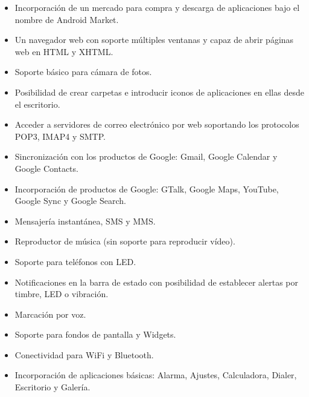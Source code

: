 \begin{itemize}
	\item Incorporación de un mercado para compra y descarga de aplicaciones bajo el nombre de Android Market.
	\item Un navegador web con soporte múltiples ventanas y  capaz de abrir páginas web en HTML y XHTML.
	\item Soporte básico para cámara de fotos.
	\item Posibilidad de crear carpetas e introducir iconos de aplicaciones en ellas desde el escritorio.
	\item Acceder a servidores de correo electrónico por web soportando los protocolos POP3, IMAP4 y SMTP.
	\item Sincronización con los productos de Google: Gmail, Google Calendar y Google Contacts.
	\item Incorporación de productos de Google: GTalk, Google Maps, YouTube, Google Sync y Google Search.
	\item Mensajería instantánea, SMS y MMS.
	\item Reproductor de música (sin soporte para reproducir vídeo).
	\item Soporte para teléfonos con LED.
	\item Notificaciones en la barra de estado con posibilidad de establecer alertas por timbre, LED o vibración.
	\item Marcación por voz.
	\item Soporte para fondos de pantalla y Widgets.
	\item Conectividad para WiFi y Bluetooth.
	\item Incorporación de aplicaciones básicas: Alarma, Ajustes, Calculadora, Dialer, Escritorio y  Galería.
\end{itemize}